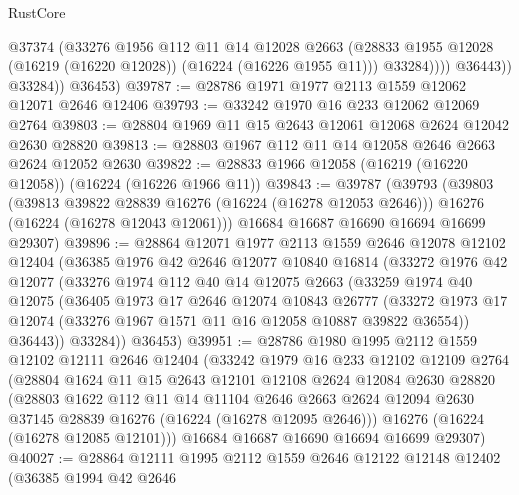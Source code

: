 \begin{lexlean}{RustCore}
\begin{coremodule}
                    @37374
                    (@33276
                      @1956
                      @112
                      @11
                      @14
                      @12028
                      @2663
                      (@28833 @1955 @12028 (@16219 (@16220 @12028)) (@16224 (@16226 @1955 @11)))
                      @33284))))
              @36443))
          @33284))
      @36453)
@39787 := @28786 @1971 @1977 @2113 @1559 @12062 @12071 @2646 @12406
@39793 := @33242 @1970 @16 @233 @12062 @12069 @2764
@39803 := @28804 @1969 @11 @15 @2643 @12061 @12068 @2624 @12042 @2630 @28820
@39813 := @28803 @1967 @112 @11 @14 @12058 @2646 @2663 @2624 @12052 @2630
@39822 := @28833 @1966 @12058 (@16219 (@16220 @12058)) (@16224 (@16226 @1966 @11))
@39843 := @39787
    (@39793
      (@39803
        (@39813 @39822 @28839 @16276 (@16224 (@16278 @12053 @2646)))
        @16276
        (@16224 (@16278 @12043 @12061)))
      @16684
      @16687
      @16690
      @16694
      @16699
      @29307)
@39896 := @28864
    @12071
    @1977
    @2113
    @1559
    @2646
    @12078
    @12102
    @12404
    (@36385
      @1976
      @42
      @2646
      @12077
      @10840
      @16814
      (@33272
        @1976
        @42
        @12077
        (@33276
          @1974
          @112
          @40
          @14
          @12075
          @2663
          (@33259
            @1974
            @40
            @12075
            (@36405
              @1973
              @17
              @2646
              @12074
              @10843
              @26777
              (@33272 @1973 @17 @12074 (@33276 @1967 @1571 @11 @16 @12058 @10887 @39822 @36554))
              @36443))
          @33284))
      @36453)
@39951 := @28786
    @1980
    @1995
    @2112
    @1559
    @12102
    @12111
    @2646
    @12404
    (@33242
      @1979
      @16
      @233
      @12102
      @12109
      @2764
      (@28804
        @1624
        @11
        @15
        @2643
        @12101
        @12108
        @2624
        @12084
        @2630
        @28820
        (@28803
          @1622
          @112
          @11
          @14
          @11104
          @2646
          @2663
          @2624
          @12094
          @2630
          @37145
          @28839
          @16276
          (@16224 (@16278 @12095 @2646)))
        @16276
        (@16224 (@16278 @12085 @12101)))
      @16684
      @16687
      @16690
      @16694
      @16699
      @29307)
@40027 := @28864
    @12111
    @1995
    @2112
    @1559
    @2646
    @12122
    @12148
    @12402
    (@36385
      @1994
      @42
      @2646

\end{coremodule}
\end{lexlean}
